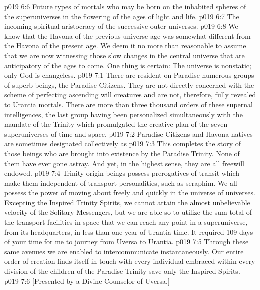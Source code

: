\pc \vs p019 6:6 \bibnobreakspace Future types of mortals who may be born on the inhabited spheres of the superuniverses in the flowering of the ages of light and life.
\vs p019 6:7 \bibnobreakspace The incoming spiritual aristocracy of the successive outer universes.
\vs p019 6:8 We know that the Havona of the previous universe age was somewhat different from the Havona of the present age. We deem it no more than reasonable to assume that we are now witnessing those slow changes in the central universe that are anticipatory of the ages to come. One thing is certain: The universe is nonstatic; only God is changeless.
\vs p019 7:1 There are resident on Paradise numerous groups of superb beings, the Paradise Citizens. They are not directly concerned with the scheme of perfecting ascending will creatures and are not, therefore, fully revealed to Urantia mortals. There are more than three thousand orders of these supernal intelligences, the last group having been personalized simultaneously with the mandate of the Trinity which promulgated the creative plan of the seven superuniverses of time and space.
\pc \vs p019 7:2 Paradise Citizens and Havona natives are sometimes designated collectively as 
\pc \vs p019 7:3 This completes the story of those beings who are brought into existence by the Paradise Trinity. None of them have ever gone astray. And yet, in the highest sense, they are all freewill endowed.
\vs p019 7:4 Trinity\hyp{}origin beings possess prerogatives of transit which make them independent of transport personalities, such as seraphim. We all possess the power of moving about freely and quickly in the universe of universes. Excepting the Inspired Trinity Spirits, we cannot attain the almost unbelievable velocity of the Solitary Messengers, but we are able so to utilize the sum total of the transport facilities in space that we can reach any point in a superuniverse, from its headquarters, in less than one year of Urantia time. It required 109 days of your time for me to journey from Uversa to Urantia.
\vs p019 7:5 Through these same avenues we are enabled to intercommunicate instantaneously. Our entire order of creation finds itself in touch with every individual embraced within every division of the children of the Paradise Trinity save only the Inspired Spirits.
\vsetoff
\vs p019 7:6 [Presented by a Divine Counselor of Uversa.]
